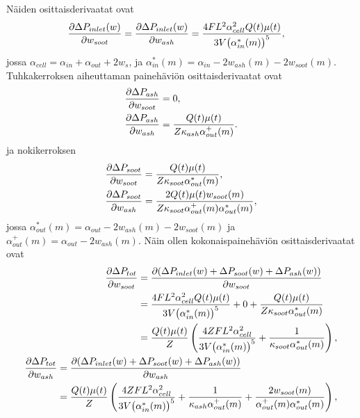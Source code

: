 Näiden osittaisderivaatat ovat
\begin{align}
    \frac{\partial \Delta P_{inlet}(w)}{\partial w_{soot}}
    &= 
    \frac{\partial \Delta P_{inlet}(w)}{\partial w_{ash}}
    = 
    \frac{4 F L^2  \alpha_{cell}^2 Q(t) \mu(t) }{3 V\bigl(\alpha_{in}^*(m)\bigr)^5},
\end{align}
jossa \(\alpha_{cell} = \alpha_{in} + \alpha_{out} + 2w_s\), ja \(\alpha_{in}^*(m)=\alpha_{in}- 2 w_{ash}(m)-2w_{soot}(m)\).
Tuhkakerroksen aiheuttaman painehäviön osittaisderivaatat ovat 
\begin{align}
    \frac{\partial \Delta P_{ash}}{\partial w_{soot}} &= 0 ,
    \\
    \frac{\partial \Delta P_{ash}}{\partial w_{ash}} &= 
    \frac{Q(t)\mu(t)}{Z \kappa_{ash} \alpha_{out}^{+}(m)}.
\end{align}
ja nokikerroksen
\begin{align}
    \frac{\partial \Delta P_{soot}}{\partial w_{soot}} &= 
    \frac{Q(t)\mu(t)}{Z\kappa_{soot}\alpha_{out}^*(m)},
    \\
    \frac{\partial \Delta P_{soot}}{\partial w_{ash}} &=
    \frac{2Q(t)\mu(t)w_{soot}(m)}
         {Z\kappa_{soot}\alpha_{out}^{+}(m)\alpha_{out}^*(m)},
\end{align}
jossa \(\alpha_{out}^*(m)=\alpha_{out}-2w_{ash}(m)-2w_{soot}(m)\) ja \(\alpha_{out}^{+}(m)=\alpha_{out}-2w_{ash}(m)\).
Näin ollen kokonaispainehäviön osittaisderivaatat ovat
\begin{align}
\begin{split}
    \frac{\partial \Delta P_{tot}}{\partial w_{soot}} &=
    \frac{\partial (\Delta P_{inlet}(w)+ \Delta P_{soot}(w)+ \Delta P_{ash}(w))}{\partial w_{soot}}
    \\ &=
    \frac{4 F L^2  \alpha_{cell}^2 Q(t) \mu(t) }{3V \bigl(\alpha_{in}^*(m)\bigr)^5}
    +
    0
    +
    \frac{Q(t)\mu(t)}{Z\kappa_{soot}\alpha_{out}^*(m)}
    \\ &=
    \frac{Q(t)\mu(t)}{Z}
    \left( 
    \frac{4 ZF L^2  \alpha_{cell}^2}{3 V\bigl(\alpha_{in}^*(m)\bigr)^5}
    +
    \frac{1}{\kappa_{soot}\alpha_{out}^*(m)}
    \right),
\end{split}
\\
\begin{split}
    \frac{\partial \Delta P_{tot}}{\partial w_{ash}} &=
    \frac{\partial (\Delta P_{inlet}(w)+ \Delta P_{soot}(w)+ \Delta P_{ash}(w))}{\partial w_{ash}}
    \\ &=
    \frac{Q(t)\mu(t)}{Z}
    \left(
    \frac{4 Z F L^2 \alpha_{cell}^2}{3 V\bigl(\alpha_{in}^*(m)\bigr)^5}
    +
    \frac{1}{\kappa_{ash} \alpha_{out}^{+}(m)}
    +
    \frac{2 w_{soot}(m)}{\alpha_{out}^{+}(m)\alpha_{out}^*(m)}
    \right),
\end{split}
\end{align}
